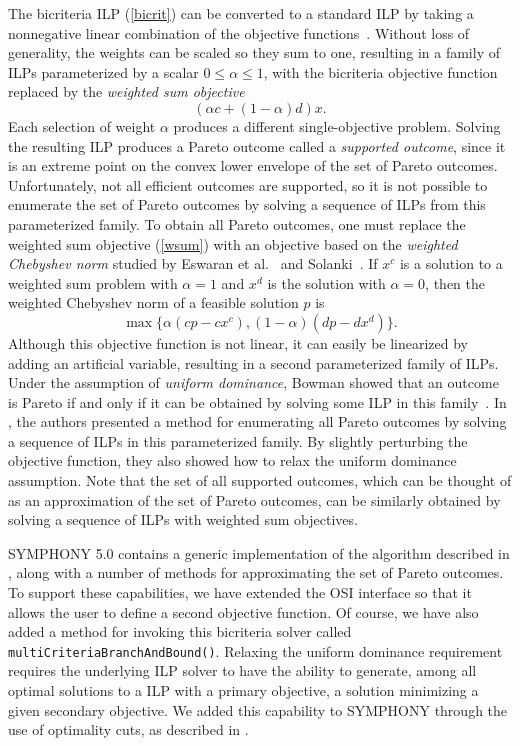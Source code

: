 The bicriteria ILP (\ref{bicrit}) can be converted to a standard ILP by
taking a nonnegative linear combination of the objective
functions~\cite{geoff68}. Without loss of generality, the weights can be
scaled so they sum to one, resulting in a family of ILPs parameterized by a
scalar $0 \leq \alpha \leq 1$, with the bicriteria objective function replaced
by the \emph{weighted sum objective}
\begin{equation}\label{wsum}
(\alpha c + (1 - \alpha) d) x.
\end{equation}
Each selection of weight $\alpha$ produces a different single-objective
problem. Solving the resulting ILP produces a Pareto outcome called a
\emph{supported outcome}, since it is an extreme point on the convex lower
envelope of the set of Pareto outcomes. Unfortunately, not all efficient
outcomes are supported, so it is not possible to enumerate the set of Pareto
outcomes by solving a sequence of ILPs from this parameterized family. To
obtain all Pareto outcomes, one must replace the weighted sum objective
(\ref{wsum}) with an objective based on the \emph{weighted Chebyshev norm}
studied by Eswaran et al.~\cite{eswaran89} and Solanki~\cite{solanki91}. If
$x^c$ is a solution to a weighted sum problem with $\alpha = 1$ and $x^d$ is
the solution with $\alpha = 0$, then the weighted Chebyshev norm of a feasible
solution $p$ is
\begin{equation}
\max \{\alpha (cp - cx^c), (1 - \alpha)(dp - dx^d)\}.
\label{chebyshev}
\end{equation} 
Although this objective function is not linear, it can easily be linearized by
adding an artificial variable, resulting in a second parameterized family of
ILPs. Under the assumption of \emph{uniform dominance}, Bowman showed that an
outcome is Pareto if and only if it can be obtained by solving some ILP in
this family~\cite{bowman76}. In \cite{WCN}, the authors presented a method for
enumerating all Pareto outcomes by solving a sequence of ILPs in this
parameterized family. By slightly perturbing the objective function, they also
showed how to relax the uniform dominance assumption. Note that the set of all
supported outcomes, which can be thought of as an approximation of the set of
Pareto outcomes, can be similarly obtained by solving a sequence of ILPs with
weighted sum objectives.

SYMPHONY 5.0 contains a generic implementation of the algorithm described in
\cite{WCN}, along with a number of methods for approximating the set of Pareto
outcomes. To support these capabilities, we have extended the OSI interface so
that it allows the user to define a second objective function. Of course, we
have also added a method for invoking this bicriteria solver called
\texttt{multiCriteriaBranchAndBound()}. Relaxing the uniform dominance
requirement requires the underlying ILP solver to have the ability to
generate, among all optimal solutions to a ILP with a primary objective, a
solution minimizing a given secondary objective. We added this capability to
SYMPHONY through the use of optimality cuts, as described in \cite{WCN}.

